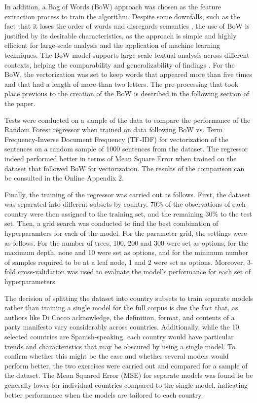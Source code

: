 \documentclass[12pt,letterpaper]{article}
\begin{document}
In addition, a Bag of Words (BoW) approach was chosen as the feature extraction process to train the algorithm. Despite some downfalls, such as the fact that it loses the order of words and disregards semantics\autocite{leDistributedRepresentationsSentences2014} , the use of BoW is justified by its desirable characteristics, as the approach is simple and highly efficient for large-scale analysis and the application of machine learning techniques. The BoW model supports large-scale textual analysis across different contexts, helping the comparability and generalizability of findings\autocite{grimmerTextDataPromise2013} . For the BoW, the vectorization was set to keep words that appeared more than five times and that had a length of more than two letters. The pre-processing that took place previous to the creation of the BoW is described in the following section of the paper. 

Tests were conducted on a sample of the data to compare the performance of the Random Forest regressor when trained on data following BoW vs. Term Frequency-Inverse Document Frequency (TF-IDF) for vectorization of the sentences on a random sample of 1000 sentences from the dataset. The regressor indeed performed better in terms of Mean Square Error when trained on the dataset that followed BoW for vectorization. The results of the comparison can be consulted in the Online Appendix 2.  

Finally, the training of the regressor was carried out as follows. First, the dataset was separated into different subsets by country. 70\% of the observations of each country were then assigned to the training set, and the remaining 30\% to the test set. Then, a grid search was conducted to find the best combination of hyperparamters for each of the model. For the parameter grid, the settings were as follows. For the number of trees, 100, 200 and 300 were set as options, for the maximum depth, none and 10 were set as options, and for the minimum number of samples required to be at a leaf node, 1 and 2 were set as options. Moreover, 3-fold cross-validation was used to evaluate the model's performance for each set of hyperparameters. 

The decision of splitting the dataset into country subsets to train separate models rather than training a single model for the full corpus is due the fact that, as authors like Di Cocco\autocite{coccoHowPopulistAre2022} acknowledge, the definition, format, and contents of a party manifesto vary considerably across countries. Additionally, while the 10 selected countries are Spanish-speaking, each country would have particular trends and characteristics that may be obscured by using a single model. To confirm whether this might be the case and whether several models would perform better, the two exercises were carried out and compared for a sample of the dataset. The Mean Squared Error (MSE) for separate models was found to be generally lower for individual countries compared to the single model, indicating better performance when the models are tailored to each country.
\end{document}
